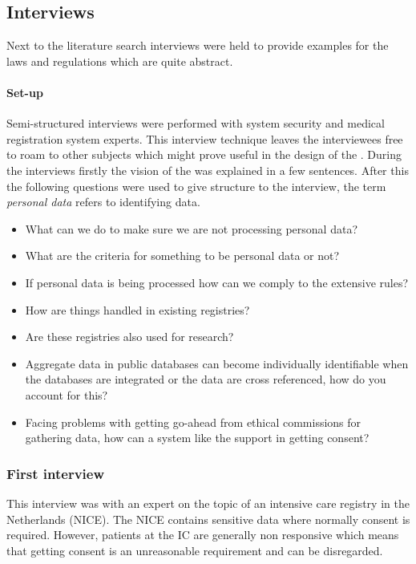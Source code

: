 \subsection{Interviews}
\label{security-interviews}

Next to the literature search interviews were held to provide examples for the laws and regulations which are quite abstract.

\paragraph{Set-up} 
\label{security-set-up}

Semi-structured interviews were performed with system security and medical registration system experts.
This interview technique leaves the interviewees free to roam to other subjects which might prove useful in the design of the \ivfsystem{}.
During the interviews firstly the vision of the \ivfsystem{} was explained in a few sentences.
After this the following questions were used to give structure to the interview, the term \emph{personal data} refers to identifying data.

\begin{itemize}
	\item What can we do to make sure we are not processing personal data?
	\item What are the criteria for something to be personal data or not?
	\item If personal data is being processed how can we comply to the extensive rules?
	\item How are things handled in existing registries?
	\item Are these registries also used for research?
	\item Aggregate data in public databases can become individually identifiable when the databases are integrated or the data are cross referenced, how do you account for this?
	\item Facing problems with getting go-ahead from ethical commissions for gathering data, how can a system like the \ivfsystem{} support in getting consent?
\end{itemize}

\subsubsection{First interview}
\label{security-first-interview}

This interview was with an expert on the topic of an intensive care registry in the Netherlands (NICE).
The NICE contains sensitive data where normally consent is required. 
However, patients at the IC are generally non responsive which means that getting consent is an unreasonable requirement and can be disregarded.

